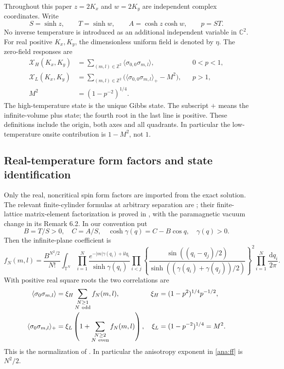 \documentclass[11pt]{article}
\numberwithin{equation}{section}
\theoremstyle{definition}
\newcommand{\C}{\mathbb C}
\newcommand{\Z}{\mathbb Z}
\newcommand{\T}{\mathbb T}
\newcommand{\ii}{\mathrm i}
\newcommand{\dd}{\,\mathrm d}
\newcommand{\XH}{\mathcal X_H}
\newcommand{\XL}{\mathcal X_L}
\begin{document}
Throughout this paper \(z=2K_x\) and \(w=2K_y\) are independent
complex coordinates. Write
\[
 S=\sinh z,\qquad T=\sinh w,\qquad
 A=\cosh z\cosh w,\qquad p=ST.
\]
No inverse temperature is introduced as an additional independent
variable in \(\C^2\). For real positive \(K_x,K_y\), the
dimensionless uniform field is denoted by \(\eta\). The zero-field
responses are
\begin{align}
 \XH(K_x,K_y)
 &=\sum_{(m,l)\in\Z^2}\langle\sigma_{0,0}\sigma_{m,l}\rangle,
 &&0<p<1, \label{ana:physicalHT}\\
 \XL(K_x,K_y)
 &=\sum_{(m,l)\in\Z^2}
   \bigl(\langle\sigma_{0,0}\sigma_{m,l}\rangle_+-M^2\bigr),
 &&p>1, \label{ana:physicalLT}\\
 M^2&=(1-p^{-2})^{1/4}. \nonumber
\end{align}
The high-temperature state is the unique Gibbs state. The subscript
\(+\) means the infinite-volume plus state; the fourth root in the last
line is positive. These definitions include the origin, both axes and
all quadrants. In particular the low-temperature onsite contribution
is \(1-M^2\), not \(1\).

\subsection{Real-temperature form factors and state identification}
\label{ana:interface}

Only the real, noncritical spin form factors are imported from the
exact solution. The relevant finite-cylinder formulas at arbitrary
separation are \cite[(35)--(39)]{BL}; their finite-lattice matrix-element
factorization is proved in \cite[Theorem 6.1]{IL}, with the
paramagnetic vacuum change in its Remark 6.2. In our convention put
\[
 B=T/S>0,\quad C=A/S,\quad
 \cosh\gamma(q)=C-B\cos q,\quad \gamma(q)>0.
\]
Then the infinite-plane coefficient is
\begin{equation}\label{ana:ff}
 f_N(m,l)=\frac{B^{N^2/2}}{N!}
 \int_{\T^N}\prod_{i=1}^N
 \frac{e^{-|m|\gamma(q_i)+\ii lq_i}}{\sinh\gamma(q_i)}
 \prod_{i<j}
 \left\{\frac{\sin((q_i-q_j)/2)}
 {\sinh((\gamma(q_i)+\gamma(q_j))/2)}\right\}^{\!2}
 \prod_{i=1}^N\frac{\dd q_i}{2\pi}.
\end{equation}
With positive real square roots the two correlations are
\begin{align}
 \langle\sigma_0\sigma_{m,l}\rangle
 &=\xi_H\sum_{\substack{N\ge1\\N\ {\rm odd}}}f_N(m,l),
 &\xi_H&=(1-p^2)^{1/4}p^{-1/2},\label{ana:corHT}\\
 \langle\sigma_0\sigma_{m,l}\rangle_+
 &=\xi_L\left(1+\sum_{\substack{N\ge2\\N\ {\rm even}}}f_N(m,l)\right),
 &\xi_L&=(1-p^{-2})^{1/4}=M^2.\label{ana:corLT}
\end{align}
This is the normalization of \cite[(1.8)--(1.10)]{ONGP}.
In particular the anisotropy exponent in \eqref{ana:ff} is \(N^2/2\).
\end{document}
